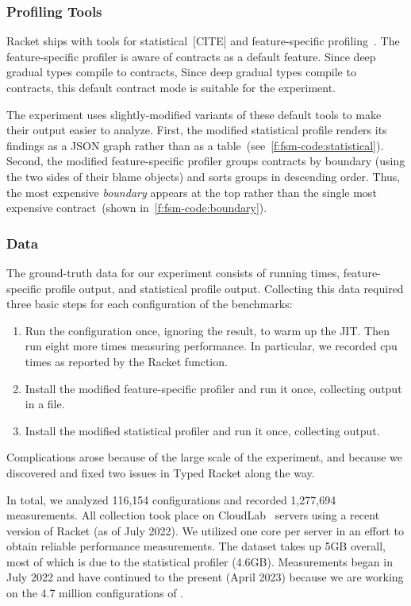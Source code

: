 \subsubsection{Profiling Tools}

Racket ships with tools for statistical~[CITE] and feature-specific
profiling~\cite{}.
The feature-specific profiler is aware of contracts as a default feature.
Since deep gradual types compile to contracts,
Since deep gradual types compile to contracts, this default contract
mode is suitable for the experiment.

The experiment uses slightly-modified variants of these default tools
to make their output easier to analyze.
First, the modified statistical profile renders its
findings as a JSON graph rather than as a table~(see~\cref{f:fsm-code:statistical}).
Second, the modified feature-specific profiler groups contracts
by boundary (using the two sides of their blame objects) and sorts groups
in descending order.
Thus, the most expensive \emph{boundary} appears at the top rather than the single
most expensive contract~(shown in~\cref{f:fsm-code:boundary}).


\subsubsection{Data}
\label{sec:data}

The ground-truth data for our experiment consists of running times,
feature-specific profile output, and statistical profile output.
Collecting this data required three basic steps for each configuration
of the \numgtp{} benchmarks:
\begin{enumerate}
  \item
    Run the configuration once, ignoring the result, to warm up the JIT.
    Then run eight more times measuring performance.
    In particular, we recorded {cpu time}s as reported by the Racket
     function.
  \item
    Install the modified feature-specific profiler and run it once,
    collecting output in a file.
  \item
    Install the modified statistical profiler and run it once, collecting output.
\end{enumerate}
Complications arose because of the large scale of the experiment, and because
we discovered and fixed two issues in Typed Racket along the way.


In total, we analyzed 116,154 configurations
and recorded 1,277,694 measurements.
All collection took place on CloudLab~\cite{cloudlab} servers using a recent
version of Racket (as of July 2022).
We utilized one core per server in an effort to obtain reliable performance
measurements.
The dataset takes up 5GB overall, most of which is due to the statistical
profiler (4.6GB).
Measurements began in July 2022 and have continued to the present (April 2023)
because we are working on the 4.7 million configurations of .

